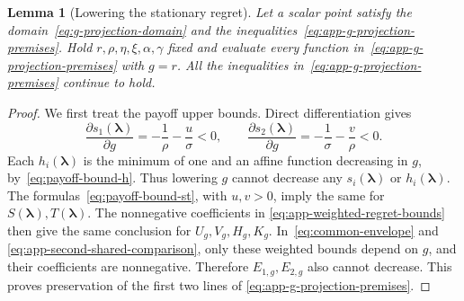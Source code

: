\documentclass[11pt]{article}
\newtheorem{lemma}[theorem]{Lemma}
\theoremstyle{remark}
\theoremstyle{plain}
\begin{document}
\begin{lemma}[Lowering the stationary regret]
\label{lem:app-g-projection}
Let a scalar point satisfy the domain~\eqref{eq:g-projection-domain}
and the inequalities~\eqref{eq:app-g-projection-premises}.
Hold $r,\rho,\eta,\xi,\alpha,\gamma$ fixed and evaluate every
function in~\eqref{eq:app-g-projection-premises} with $g=r$.
All the inequalities in~\eqref{eq:app-g-projection-premises}
continue to hold.
\end{lemma}
\begin{proof}
We first treat the payoff upper bounds. Direct differentiation gives
\begin{equation}
 \frac{\partial s_1(\boldsymbol\lambda)}{\partial g}=-\frac1\rho-\frac u\sigma<0,\qquad
 \frac{\partial s_2(\boldsymbol\lambda)}{\partial g}=-\frac1\sigma-\frac v\rho<0.
 \label{eq:app-g-payoff-bound-derivatives}
\end{equation}
Each $h_i(\boldsymbol\lambda)$ is the minimum of one and an affine function decreasing
in $g$, by~\eqref{eq:payoff-bound-h}. Thus lowering $g$ cannot decrease
any $s_i(\boldsymbol\lambda)$ or $h_i(\boldsymbol\lambda)$.
The formulas~\eqref{eq:payoff-bound-st}, with $u,v>0$, imply the
same for $S(\boldsymbol\lambda),T(\boldsymbol\lambda)$. The nonnegative coefficients in
\eqref{eq:app-weighted-regret-bounds} then give the same conclusion
for $U_g,V_g,H_g,K_g$.
In~\eqref{eq:common-envelope} and
\eqref{eq:app-second-shared-comparison}, only these weighted bounds
depend on $g$, and their coefficients are nonnegative.
Therefore $E_{1,g},E_{2,g}$ also cannot decrease.
This proves preservation of the first two lines of
\eqref{eq:app-g-projection-premises}.


\end{proof}
\end{document}
